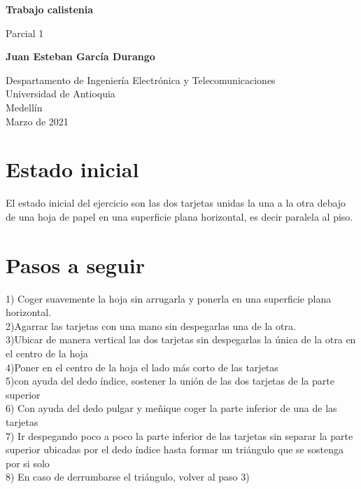\documentclass{article}
\begin{document}
\begin{titlepage}
    \begin{center}
        \vspace*{1cm}
            
        \Huge
        \textbf{Trabajo calistenia}
            
        \vspace{0.5cm}
        \LARGE
        Parcial 1
            
        \vspace{1.5cm}
            
        \textbf{Juan Esteban García Durango}
            
        \vfill
            
        \vspace{0.8cm}
            
        \Large
        Despartamento de Ingeniería Electrónica y Telecomunicaciones\\
        Universidad de Antioquia\\
        Medellín\\
        Marzo de 2021
            
    \end{center}
\end{titlepage}

\tableofcontents
\newpage
\section{Estado inicial}\label{intro}
El estado inicial del ejercicio son las dos tarjetas unidas la una a la otra debajo de una hoja de papel en una superficie plana horizontal, es decir paralela al piso.

\section{Pasos a seguir} \label{contenido}
1) Coger suavemente la hoja sin arrugarla y ponerla en una superficie plana horizontal.\\
2)Agarrar las tarjetas con una mano sin despegarlas una de la otra.\\
3)Ubicar de manera vertical las dos tarjetas sin despegarlas la única de la otra en el centro de la hoja\\
4)Poner en el centro de la hoja el lado más corto de las tarjetas\\
5)con ayuda del dedo índice, sostener la unión de las dos tarjetas de la parte superior\\
6) Con ayuda del dedo pulgar y meñique coger la parte inferior de una de las tarjetas\\
7) Ir despegando poco a poco la parte inferior de las tarjetas sin separar la parte superior ubicadas por el dedo índice hasta formar un triángulo que se sostenga por si solo\\
8) En caso de derrumbarse el triángulo, volver al paso 3)\\
\end{document}
